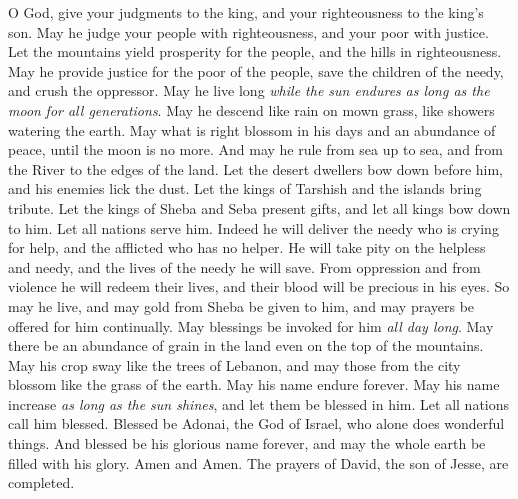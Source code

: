 \begin{biblechapter} %
 O God, give your judgments to the king, 
and your righteousness to the king’s son.
\verse May he judge your people with righteousness, 
and your poor with justice.
\verse Let the mountains yield prosperity for the people, 
and the hills in righteousness.
\verse May he provide justice for the poor of the people, 
save the children of the needy, 
and crush the oppressor.
\verse May he live long \textit{while the sun endures} 
\textit{as long as the moon} \textit{for all generations}.
\verse May he descend like rain on mown grass, 
like showers watering the earth.
\verse May what is right blossom in his days 
and an abundance of peace, until the moon is no more.
\verse And may he rule from sea up to sea, 
and from the River to the edges of the land.
\verse Let the desert dwellers bow down before him, 
and his enemies lick the dust.
\verse Let the kings of Tarshish and the islands bring tribute. 
Let the kings of Sheba and Seba present gifts,
\verse and let all kings bow down to him. 
Let all nations serve him.
\verse Indeed he will deliver the needy who is crying for help, 
and the afflicted who has no helper.
\verse He will take pity on the helpless and needy, 
and the lives of the needy he will save.
\verse From oppression and from violence 
he will redeem their lives, 
and their blood will be precious in his eyes.
\verse So may he live, and may gold from Sheba be given to him, 
and may prayers be offered for him continually. 
May blessings be invoked for him \textit{all day long}.
\verse May there be an abundance of grain in the land 
even on the top of the mountains. 
May his crop sway like the trees of Lebanon, 
and may those from the city blossom like the grass of the earth.
\verse May his name endure forever. 
May his name increase \textit{as long as the sun shines}, 
and let them be blessed in him. 
Let all nations call him blessed.
\verse Blessed be Adonai, the God of Israel, 
who alone does wonderful things.
\verse And blessed be his glorious name forever, 
and may the whole earth be filled with his glory. 
Amen and Amen.
\verse The prayers of David, the son of Jesse, are completed.
\end{biblechapter}

